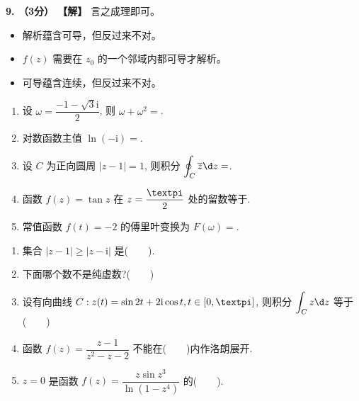 \documentclass[simple]{hfutexam}
\newcommand{\ii}{\mathrm{i}}
\newcommand{\cpi}{{\text{\textpi}}}
\newcommand{\dint}{\displaystyle\int}
\newcommand{\doint}{\displaystyle\oint}
\newcommand\ov{\overline}
\begin{document}
\textbf{9. （3分） 【解】}
言之成理即可。
\begin{itemize}
  \item 解析蕴含可导，但反过来不对。
  \item $f(z)$ 需要在 $z_0$ 的一个邻域内都可导才解析。
  \item 可导蕴含连续，但反过来不对。
\end{itemize}


\newpage
{}
\ZhuanYeBanJi{}
\maketitle

\begin{enumerate}
  \item 设 $\omega=\dfrac{-1-\sqrt3\ii}2$, 则 $\omega+\omega^2=$\fillblank{}.
  \item 对数函数主值 $\ln(-\ii)=$\fillblank{}.
  \item 设 $C$ 为正向圆周 $|z-1|=1$, 则积分 $\doint_{C}\ov z\d z=$\fillblank{}.
  \item 函数 $f(z)=\tan z$ 在 $z=\dfrac\cpi2$ 处的留数等于\fillblank{}.
  \item 常值函数 $f(t)=-2$ 的傅里叶变换为 $F(\omega)=$\fillblank{}.
\end{enumerate}

\begin{enumerate}
  \item 集合 $|z-1|\ge|z-\ii |$ 是(~~~~).
  \item 下面哪个数不是纯虚数?(~~~~)
  \xx{$\ln(-1)$}{$\cos i$}{$\sin i$}{$\sqrt{-\cpi}$ 主值}
  \item 设有向曲线 $C:z(t)=\sin{2t}+2\ii \cos{t},t\in[0,\cpi]$, 则积分 $\dint_C z\d z$ 等于(~~~~)
  \xx{$0$}{$-2\ii $}{$-4\ii$}{$4\ii$}
  \item 函数 $f(z)=\dfrac{z-1}{z^2-z-2}$ 不能在(~~~~)内作洛朗展开.
  \item $z=0$ 是函数 $f(z)=\dfrac{z\sin z^3}{\ln(1-z^4)}$ 的(~~~~).
\end{enumerate}
\end{document}
